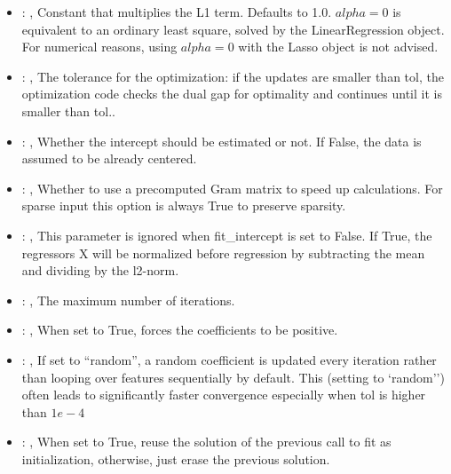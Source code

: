 \begin{itemize}
    \item {}: , 
      Constant that multiplies the L1 term. Defaults to 1.0.
      $alpha = 0$ is equivalent to an ordinary least square, solved by
      the LinearRegression object. For numerical reasons, using $alpha = 0$
      with the Lasso object is not advised.

    \item {}: , 
      The tolerance for the optimization: if the updates are smaller
      than tol, the optimization code checks the dual gap for optimality and
      continues until it is smaller than tol..

    \item {}: , 
      Whether the intercept should be estimated or not. If False,
      the data is assumed to be already centered.

    \item {}: , 
      Whether to use a precomputed Gram matrix to speed up calculations.
      For sparse input this option is always True to preserve sparsity.

    \item {}: , 
      This parameter is ignored when fit\_intercept is set to False. If True,
      the regressors X will be normalized before regression by subtracting the mean and
      dividing by the l2-norm.

    \item {}: , 
      The maximum number of iterations.

    \item {}: , 
      When set to True, forces the coefficients to be positive.

    \item {}: , 
      If set to ``random'', a random coefficient is updated every iteration
      rather than looping over features sequentially by default. This (setting to `random'')
      often leads to significantly faster convergence especially when tol is higher than $1e-4$

    \item {}: , 
      When set to True, reuse the solution of the previous call
      to fit as initialization, otherwise, just erase the previous solution.
  \end{itemize}
